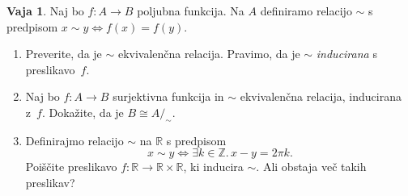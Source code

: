 \documentclass{article}
\newcommand{\some}[1]{\exists #1 .\,}
\newcommand{\ZZ}{\mathbb{Z}}
\newcommand{\RR}{\mathbb{R}}
\theoremstyle{definition}
\newtheorem{vaja}{Vaja}
\begin{document}

\begin{vaja}
	Naj bo $f\colon A \to B$ poljubna funkcija. Na $A$ definiramo relacijo $\sim$ s predpisom $x \sim y \iff f(x) = f(y)$.
	\begin{enumerate}
		\item
		Preverite, da je $\sim$ ekvivalenčna relacija. Pravimo, da je $\sim$ \emph{inducirana} s preslikavo~$f$.
		\item
		Naj bo $f\colon A \to B$ surjektivna funkcija in $\sim$ ekvivalenčna relacija, inducirana z~$f$. Dokažite, da je $B \cong A/_\sim$.
		\item
		Definirajmo relacijo $\sim$ na $\RR$ s predpisom
		\begin{equation*}
			x \sim y \iff \some{k \in \ZZ}{x - y = 2 \pi k}.
		\end{equation*}
		Poiščite preslikavo $f\colon \RR \to \RR \times \RR$, ki inducira $\sim$. Ali obstaja več takih preslikav?
	\end{enumerate}
\end{vaja}


\end{document}

